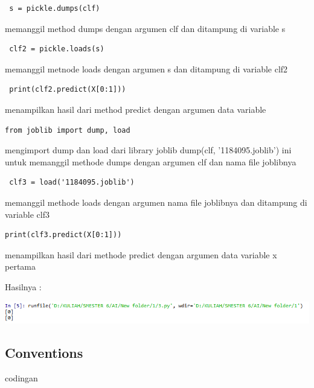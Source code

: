 \documentclass{article}
\begin{document}
        \begin{verbatim} s = pickle.dumps(clf) \end{verbatim} memanggil method dumps dengan argumen clf dan ditampung di variable s
        
        \begin{verbatim} clf2 = pickle.loads(s)\end{verbatim} memanggil metnode loads dengan argumen s dan ditampung di variable clf2
        
        \begin{verbatim} print(clf2.predict(X[0:1]))\end{verbatim}menampilkan hasil dari method predict dengan argumen data variable

        \begin{verbatim}from joblib import dump, load\end{verbatim} mengimport dump dan load dari library joblib dump(clf, '1184095.joblib') ini untuk memanggil methode dumps dengan argumen clf dan nama file joblibnya
        
        \begin{verbatim} clf3 = load('1184095.joblib') \end{verbatim} memanggil methode loads dengan argumen nama file joblibnya dan ditampung di variable clf3
        
        \begin{verbatim}print(clf3.predict(X[0:1]))\end{verbatim}menampilkan hasil dari methode predict dengan argumen data variable x pertama
        
Hasilnya :
\begin{center}
    \includegraphics[width=.8\textwidth]{figures/1184090/chapter1/7.PNG}
\end{center}



\subsection{Conventions}
codingan
\end{document}
